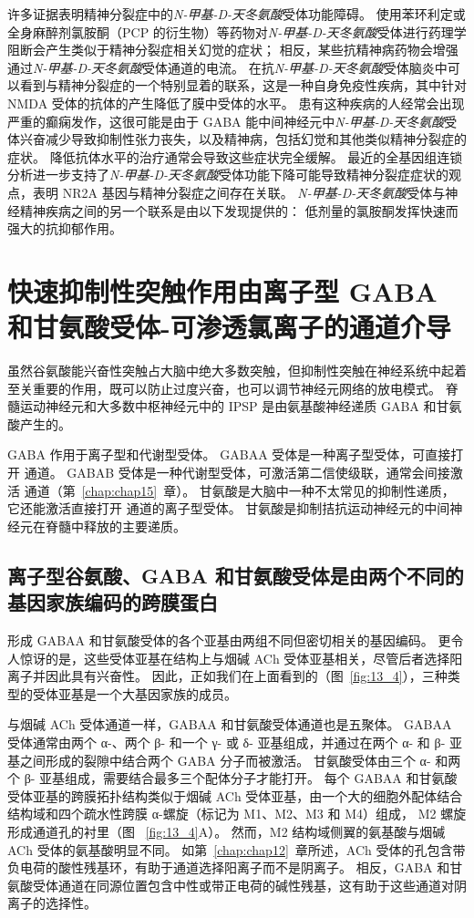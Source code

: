 许多证据表明精神分裂症中的\textit{N-甲基-D-天冬氨酸}受体功能障碍。
使用苯环利定或全身麻醉剂氯胺酮（PCP 的衍生物）等药物对\textit{N-甲基-D-天冬氨酸}受体进行药理学阻断会产生类似于精神分裂症相关幻觉的症状；
相反，某些抗精神病药物会增强通过\textit{N-甲基-D-天冬氨酸}受体通道的电流。
在抗\textit{N-甲基-D-天冬氨酸}受体脑炎中可以看到与精神分裂症的一个特别显着的联系，这是一种自身免疫性疾病，其中针对 NMDA 受体的抗体的产生降低了膜中受体的水平。
患有这种疾病的人经常会出现严重的癫痫发作，这很可能是由于 GABA 能中间神经元中\textit{N-甲基-D-天冬氨酸}受体兴奋减少导致抑制性张力丧失，以及精神病，包括幻觉和其他类似精神分裂症的症状。
降低抗体水平的治疗通常会导致这些症状完全缓解。
最近的全基因组连锁分析进一步支持了\textit{N-甲基-D-天冬氨酸}受体功能下降可能导致精神分裂症症状的观点，表明 NR2A 基因与精神分裂症之间存在关联。
\textit{N-甲基-D-天冬氨酸}受体与神经精神疾病之间的另一个联系是由以下发现提供的：
低剂量的氯胺酮发挥快速而强大的抗抑郁作用。



\section{快速抑制性突触作用由离子型 GABA 和甘氨酸受体-可渗透氯离子的通道介导}

虽然谷氨酸能兴奋性突触占大脑中绝大多数突触，但抑制性突触在神经系统中起着至关重要的作用，既可以防止过度兴奋，也可以调节神经元网络的放电模式。
脊髓运动神经元和大多数中枢神经元中的 IPSP 是由氨基酸神经递质 GABA 和甘氨酸产生的。


GABA 作用于离子型和代谢型受体。 GABAA 受体是一种离子型受体，可直接打开  通道。
GABAB 受体是一种代谢型受体，可激活第二信使级联，通常会间接激活  通道（第~\ref{chap:chap15}~章）。 
甘氨酸是大脑中一种不太常见的抑制性递质，它还能激活直接打开  通道的离子型受体。
甘氨酸是抑制拮抗运动神经元的中间神经元在脊髓中释放的主要递质。



\subsection{离子型谷氨酸、GABA 和甘氨酸受体是由两个不同的基因家族编码的跨膜蛋白}

形成 GABAA 和甘氨酸受体的各个亚基由两组不同但密切相关的基因编码。
更令人惊讶的是，这些受体亚基在结构上与烟碱 ACh 受体亚基相关，尽管后者选择阳离子并因此具有兴奋性。 
因此，正如我们在上面看到的（图~\ref{fig:13_4}），三种类型的受体亚基是一个大基因家族的成员。


与烟碱 ACh 受体通道一样，GABAA 和甘氨酸受体通道也是五聚体。
GABAA 受体通常由两个 α-、两个 β- 和一个 γ- 或 δ- 亚基组成，并通过在两个 α- 和 β- 亚基之间形成的裂隙中结合两个 GABA 分子而被激活。
甘氨酸受体由三个 α- 和两个 β- 亚基组成，需要结合最多三个配体分子才能打开。
每个 GABAA 和甘氨酸受体亚基的跨膜拓扑结构类似于烟碱 ACh 受体亚基，由一个大的细胞外配体结合结构域和四个疏水性跨膜 α-螺旋（标记为 M1、M2、M3 和 M4）组成， M2 螺旋形成通道孔的衬里（图 ~\ref{fig:13_4}A）。
然而，M2 结构域侧翼的氨基酸与烟碱 ACh 受体的氨基酸明显不同。
如第~\ref{chap:chap12}~章所述，ACh 受体的孔包含带负电荷的酸性残基环，有助于通道选择阳离子而不是阴离子。
相反，GABA 和甘氨酸受体通道在同源位置包含中性或带正电荷的碱性残基，这有助于这些通道对阴离子的选择性。


